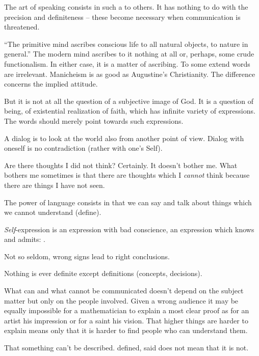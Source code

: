 The art of speaking consists in such a  to others. It has nothing to do with the 
precision and definiteness -- these become necessary when 
communication is threatened.

\pa
``The primitive mind ascribes conscious life to all natural objects,
to nature in general.'' The modern mind ascribes to it nothing at all
or, perhaps, some crude functionalism. In either case, it is a matter
of ascribing.
\pa
To some extend words are irrelevant. Manicheism is as good as Augustine's
Christianity. The difference concerns the implied attitude.

But it is not at all the question of a subjective image of God. It is
a question of being, of existential realization of faith, which has
infinite variety of expressions. The words should merely point towards
such expressions.

\pa
A dialog is to look at the world also from another point of view.
Dialog with oneself is no contradiction (rather with one's Self).

\pa
Are there thoughts I did not think? Certainly. It doesn't bother
me. What bothers me sometimes is that there are thoughts which I {\em
cannot} think because there are things I have not seen.

\pa
The power of language consists in that we can say and talk about things
which we cannot understand (define).


\pa
{\em Self}-expression is an expression with bad conscience, an 
expression which knows and admits: .

\pa
Not so seldom, wrong signs lead to right conclusions.

\pa
Nothing is ever definite except definitions (concepts, decisions).

\pa
What can and what cannot be communicated doesn't depend on the subject matter
but only on the people involved. Given a wrong audience it may be equally impossible
for a mathematician to explain a most clear proof as for an artist his impression or 
for a saint his vision. That higher things are harder to explain means only that it
is harder to find people who can understand them.

\pa That something can't be described. defined, said does not mean that it is not.


